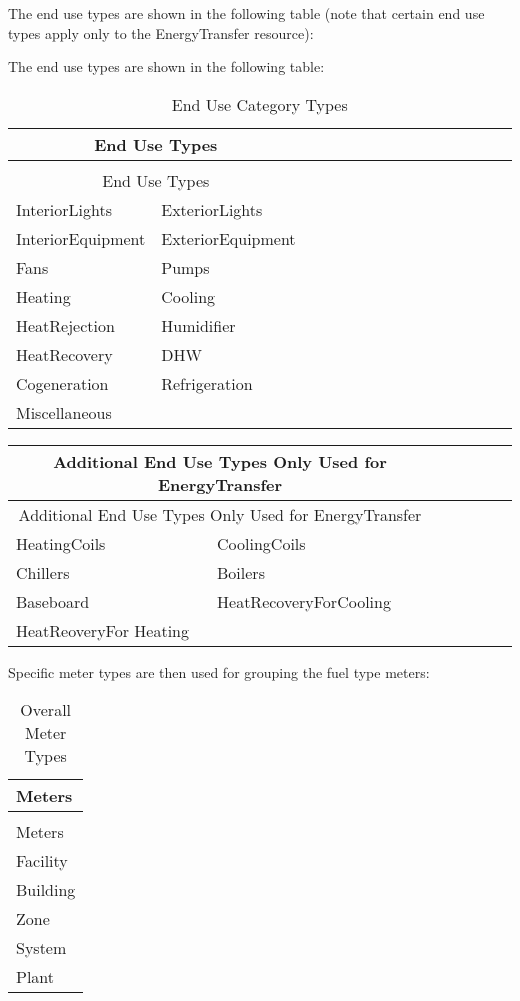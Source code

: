The end use types are shown in the following table (note that certain end use types apply only to the EnergyTransfer resource):

The end use types are shown in the following table:

\begin{longtable}[c]{p{0.4in}p{0.4in}p{0.4in}p{0.4in}p{0.4in}p{0.4in}p{0.4in}p{0.4in}p{0.4in}p{0.4in}p{0.4in}p{0.4in}p{0.4in}p{0.4in}p{0.4in}}
\caption{End Use Category Types \label{table:end-use-category-types}} \tabularnewline
\toprule 
\multicolumn{2}{c}{End Use Types} \tabularnewline
\midrule
\endfirsthead

\caption[]{End Use Category Types} \tabularnewline
\toprule 
\multicolumn{2}{c}{End Use Types} \tabularnewline
\midrule
\endhead

  InteriorLights & ExteriorLights \tabularnewline
  InteriorEquipment & ExteriorEquipment \tabularnewline
  Fans & Pumps \tabularnewline
  Heating & Cooling \tabularnewline
  HeatRejection & Humidifier \tabularnewline
  HeatRecovery & DHW \tabularnewline
  Cogeneration & Refrigeration \tabularnewline
  Miscellaneous & \tabularnewline
\bottomrule
\end{longtable}

\begin{longtable}[c]{p{0.85in}p{0.85in}p{0.85in}p{0.85in}p{0.85in}p{0.85in}p{0.85in}}
\toprule 
\multicolumn{2}{c}{Additional End Use Types Only Used for EnergyTransfer} \tabularnewline
\midrule
\endfirsthead

\toprule 
\multicolumn{2}{c}{Additional End Use Types Only Used for EnergyTransfer} \tabularnewline
\midrule
\endhead

HeatingCoils & CoolingCoils \tabularnewline
Chillers & Boilers \tabularnewline
Baseboard & HeatRecoveryForCooling \tabularnewline
HeatReoveryFor Heating & \tabularnewline
\bottomrule
\end{longtable}

Specific meter types are then used for grouping the fuel type meters:

\begin{longtable}[c]{@{}l@{}}
\caption{Overall Meter Types \label{table:overall-meter-types}} \tabularnewline
\toprule 
Meters \tabularnewline
\midrule
\endfirsthead

\caption[]{Overall Meter Types} \tabularnewline
\toprule 
Meters \tabularnewline
\midrule
\endhead

Facility \tabularnewline
Building \tabularnewline
Zone \tabularnewline
System \tabularnewline
Plant \tabularnewline
\bottomrule
\end{longtable}

